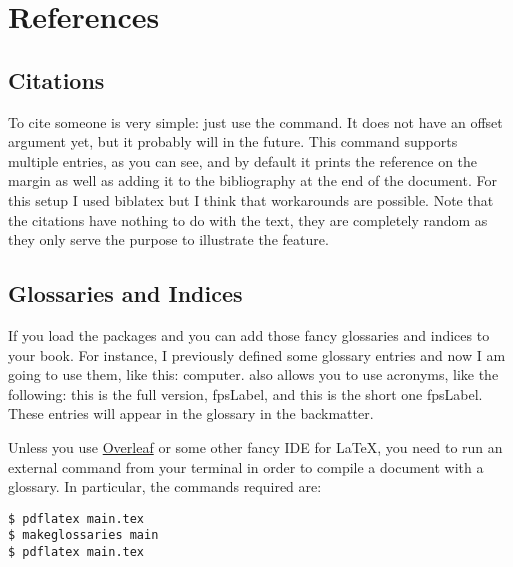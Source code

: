 \chapter{References}

\section{Citations}

To cite someone  is very simple: just 
use the  command. It does 
not have an offset argument yet, but it probably will in the future. 
This command supports multiple entries, as you can see, and by default 
it prints the reference on the margin as well as adding it to the 
bibliography at the end of the document. For this setup I used biblatex 
but I think that workarounds are possible. Note that 
the citations have nothing to do with the text, they are completely 
random as they only serve the purpose to illustrate the feature.

\section{Glossaries and Indices}

If you load the packages  and  you 
can add those fancy glossaries and indices to your book. For instance, I 
previously defined some glossary entries and now I am going to use them, 
like this: \gls{computer}.  also allows you to use 
acronyms, like the following: this is the full version, 
\acrfull{fpsLabel}, and this is the short one \acrshort{fpsLabel}. These 
entries will appear in the glossary in the backmatter.

Unless you use \href{https://www.overleaf.com}{Overleaf} or some other 
fancy IDE for \LaTeX, you need to run an external command from your 
terminal in order to compile a document with a glossary. In particular, 
the commands required are:

\begin{lstlisting}[style=kaolstplain]
$ pdflatex main.tex
$ makeglossaries main
$ pdflatex main.tex
\end{lstlisting}

